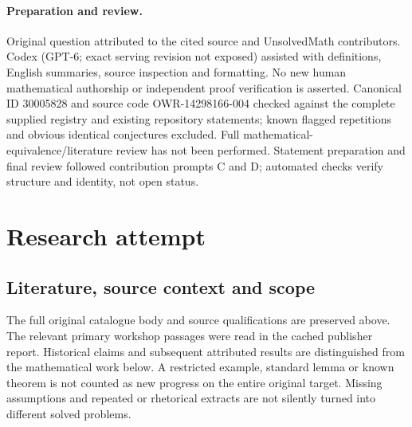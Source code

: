 \documentclass[11pt]{article}
\begin{document}
\paragraph{Preparation and review.}
Original question attributed to the cited source and UnsolvedMath contributors. Codex (GPT-6; exact serving revision not exposed) assisted with definitions, English summaries, source inspection and formatting. No new human mathematical authorship or independent proof verification is asserted. Canonical ID 30005828 and source code OWR-14298166-004 checked against the complete supplied registry and existing repository statements; known flagged repetitions and obvious identical conjectures excluded. Full mathematical-equivalence/literature review has not been performed. Statement preparation and final review followed contribution prompts C and D; automated checks verify structure and identity, not open status.
\label{end:30005828}

\section{Research attempt}
\subsection{Literature, source context and scope}
The full original catalogue body and source qualifications are preserved above. The relevant primary workshop passages were read in the cached publisher report. Historical claims and subsequent attributed results are distinguished from the mathematical work below. A restricted example, standard lemma or known theorem is not counted as new progress on the entire original target. Missing assumptions and repeated or rhetorical extracts are not silently turned into different solved problems.
\end{document}
